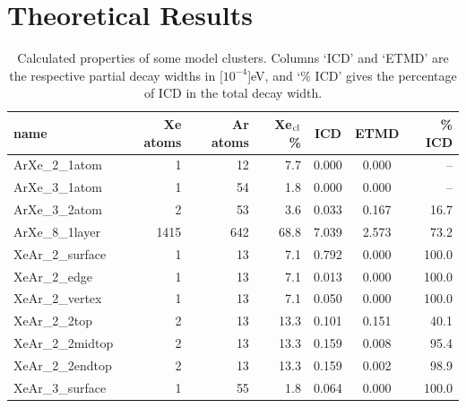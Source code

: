 \section{Theoretical Results}
%
%
\begin{table}[h]
\centering
\caption{Calculated properties of some model clusters. Columns `ICD' and `ETMD'
are the respective partial decay widths
in \unit[$10^{-4}$]{eV}, and `\% ICD' gives the percentage of ICD in the
total decay width.
}
\begin{tabular}{lrrrccr}
\toprule
name                 & Xe atoms & Ar atoms & Xe$_{\rm cl}$ \% & ICD   &  ETMD & \% ICD\\ %
\midrule
ArXe\_2\_1atom       &      1   &     12   &  7.7  & 0.000 & 0.000 &  --\\ %
ArXe\_3\_1atom       &      1   &     54   &  1.8  & 0.000 & 0.000 &  --\\ %
ArXe\_3\_2atom       &      2   &     53   &  3.6  & 0.033 & 0.167 &  16.7\\ %
ArXe\_8\_1layer      &   1415   &    642   & 68.8  & 7.039 & 2.573 &  73.2\\ %
\midrule
XeAr\_2\_surface     &      1   &     13   &  7.1  & 0.792 & 0.000 & 100.0\\ %
XeAr\_2\_edge        &      1   &     13   &  7.1  & 0.013 & 0.000 & 100.0\\ %
XeAr\_2\_vertex      &      1   &     13   &  7.1  & 0.050 & 0.000 & 100.0\\ %
XeAr\_2\_2top        &      2   &     13   & 13.3  & 0.101 & 0.151 &  40.1\\ %
XeAr\_2\_2midtop     &      2   &     13   & 13.3  & 0.159 & 0.008 &  95.4\\ %
XeAr\_2\_2endtop     &      2   &     13   & 13.3  & 0.159 & 0.002 &  98.9\\ %
XeAr\_3\_surface     &      1   &     55   &  1.8  & 0.064 & 0.000 & 100.0\\ %

\end{tabular}
\end{table}
